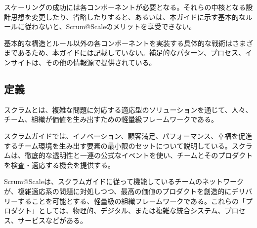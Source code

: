 \documentclass[12pt,a4paper,parskip=full]{scrartcl}
\begin{document}

スケーリングの成功には各コンポーネントが必要となる。それらの中核となる設計思想を変更したり、省略したりすると、あるいは、本ガイドに示す基本的なルールに従わないと、Scrum@Scaleのメリットを享受できない。

基本的な構造とルール以外の各コンポーネントを実装する具体的な戦術はさまざまであるため、本ガイドには記載していない。補足的なパターン、プロセス、インサイトは、その他の情報源で提供されている。

\subsection{定義}\label{definitions}

スクラムとは、複雑な問題に対応する適応型のソリューションを通じて、人々、チーム、組織が価値を生み出すための軽量級フレームワークである。

スクラムガイドでは、イノベーション、顧客満足、パフォーマンス、幸福を促進するチーム環境を生み出す要素の最小限のセットについて説明している。スクラムは、徹底的な透明性と一連の公式なイベントを使い、チームとそのプロダクトを検査・適応する機会を提供する。

Scrum@Scaleは、スクラムガイドに従って機能しているチームのネットワークが、複雑適応系の問題に対処しつつ、最高の価値のプロダクトを創造的にデリバリーすることを可能とする、軽量級の組織フレームワークである。これらの「プロダクト」としては、物理的、デジタル、または複雑な統合システム、プロセス、サービスなどがある。
\end{document}
